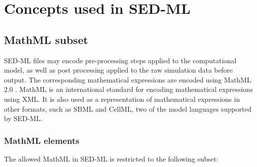 \pagebreak
\section{Concepts used in SED-ML}
\subsection{MathML subset}
\label{sec:mathML}
SED-ML files may encode pre-processing steps applied to the computational model, as well as post processing applied to the raw simulation data before output. The corresponding mathematical expressions are encoded using MathML 2.0 \citep{CIM+01}. MathML is an international standard for encoding mathematical expressions using XML. It is also used as a representation of mathematical expressions in other formats, such as SBML and CellML, two of the model languages supported by SED-ML. 


\subsubsection{MathML elements}
The allowed MathML in SED-ML is restricted to the following subset: 

